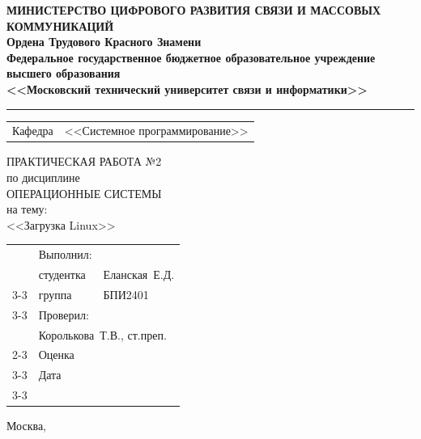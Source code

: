 \thispagestyle{empty}

\begin{center}
	\textbf{МИНИСТЕРСТВО ЦИФРОВОГО РАЗВИТИЯ СВЯЗИ И МАССОВЫХ КОММУНИКАЦИЙ} \\
	\textbf{Ордена Трудового Красного Знамени \\
		Федеральное государственное бюджетное образовательное учреждение высшего образования \\
		<<Московский технический университет связи и информатики>>}
\end{center}
\rule{\linewidth}{1pt}

\vspace{0.3em}

\begin{center}
	\begin{tabularx}{0.6\textwidth}{p{1.2cm}X}
		Кафедра & \quad <<Системное программирование>> \\%
	\end{tabularx}
\end{center}

\vspace{10em}

\begin{center}
	\Large
	ПРАКТИЧЕСКАЯ РАБОТА №2 \\
	\large
	по дисциплине \\
	ОПЕРАЦИОННЫЕ СИСТЕМЫ \\
	на тему: \\
	<<Загрузка Linux>>
\end{center}

\vspace{4em}

\renewcommand{\arraystretch}{1.1}
\begin{tabularx}{\textwidth}{p{10cm}p{2cm}p{3cm}}
	& Выполнил: & \\
	& студентка & Еланская~Е.Д. \\\cline{3-3} 
	& группа & БПИ2401 \\\cline{3-3} 
	& Проверил: &  \\
	& \multicolumn{2}{l}{Королькова~Т.В., ст.преп.} \\\cline{2-3}
	& Оценка & \\\cline{3-3} 
	& Дата & \\\cline{3-3} 
\end{tabularx}

\vspace{5em}

\begin{center}
	Москва,~\the\year
\end{center}
\clearpage


